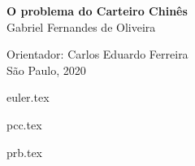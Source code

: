 \documentclass[12pt, a4paper]{article}
\begin{document}
\thispagestyle{empty}
\begin{center}
    \vspace*{2.3cm}
    \textbf{\huge{O problema do Carteiro Chinês}}\\
    
    \vspace*{1cm}
    \Large{Gabriel Fernandes de Oliveira}

    \vskip 1.8cm
    Orientador: Carlos Eduardo Ferreira\\

    \vspace{\fill}
    \normalsize{São Paulo, 2020}
\end{center}


\newpage
\tableofcontents
\newpage

{euler.tex}

{pcc.tex}

{prb.tex}

    \iffalse
        \section{Anotações}

        \begin{itemize}
            \item Todo mixed CPP pode ser transformado em um WPP.
        \end{itemize}

    \fi

	\medskip

    \newpage
    \printbibliography
 
\end{document}
